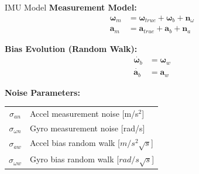 \documentclass{beamer}
\newcommand{\bgyr}{\bm{\omega}_b}
\newcommand{\bacc}{\mathbf{a}_b}
\begin{document}
\begin{frame}{IMU Model}
\textbf{Measurement Model:}
\begin{align*}
    \bm{\omega}_m &= \bm{\omega}_{true} + \bgyr + \mathbf{n}_\omega \\
    \mathbf{a}_m &= \mathbf{a}_{true} + \bacc + \mathbf{n}_a
\end{align*}

\vspace{0.3cm}
\textbf{Bias Evolution (Random Walk):}
\begin{align*}
    \dot{\bgyr} &= \bm{\omega}_w \\
    \dot{\bacc} &= \mathbf{a}_w
\end{align*}

\vspace{0.3cm}
\textbf{Noise Parameters:}
\begin{table}
\centering
\small
\begin{tabular}{cl}
\toprule
$\sigma_{an}$ & Accel measurement noise [m/s$^2$] \\
$\sigma_{\omega n}$ & Gyro measurement noise [rad/s] \\
$\sigma_{aw}$ & Accel bias random walk [$m/s^2 \sqrt{s}$]\\
$\sigma_{\omega w}$ & Gyro bias random walk [$rad/s \sqrt{s}$] \\
\bottomrule
\end{tabular}
\end{table}
\end{frame}
\end{document}

